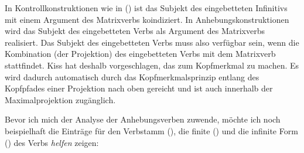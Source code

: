 In Kontrollkonstruktionen wie in () ist das Subjekt des eingebetteten
Infinitivs mit einem Argument des Matrixverbs koindiziert. In Anhebungskonstruktionen
wird das Subjekt des eingebetteten Verbs als Argument des Matrixverbs realisiert.
Das Subjekt des eingebetteten Verbs muss also verfügbar sein, wenn die Kombination
(der Projektion) des eingebetteten Verbs mit dem Matrixverb stattfindet. Kiss
hat deshalb vorgeschlagen, das \subjm zum Kopfmerkmal zu machen. Es wird dadurch
automatisch durch das Kopfmerkmalsprinzip entlang des Kopfpfades einer Projektion
nach oben gereicht und ist auch innerhalb der Maximalprojektion zugänglich.

Bevor ich mich der Analyse der Anhebungsverben zuwende, möchte ich noch beispielhaft die Einträge
für den Verbstamm (), die finite () und die infinite Form () des Verbs
\emph{helfen} zeigen:

